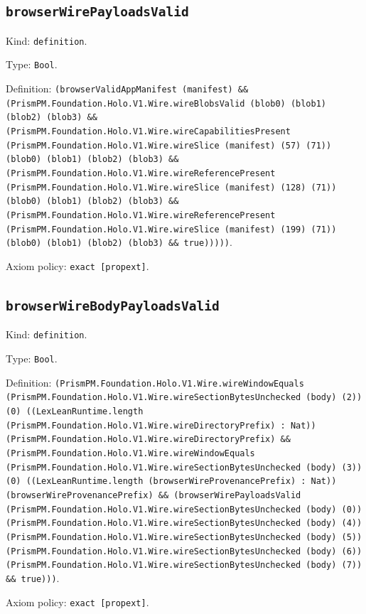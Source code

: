 \documentclass[11pt]{article}
\begin{document}
\subsection*{\texttt{browserWirePayloadsValid}}
\noindent Kind: \texttt{definition}.\par
\noindent Type: \texttt{Bool}.\par
\noindent Definition: \texttt{(browserValidAppManifest (manifest) \&\& (PrismPM.Foundation.Holo.V1.Wire.wireBlobsValid (blob0) (blob1) (blob2) (blob3) \&\& (PrismPM.Foundation.Holo.V1.Wire.wireCapabilitiesPresent (PrismPM.Foundation.Holo.V1.Wire.wireSlice (manifest) (57) (71)) (blob0) (blob1) (blob2) (blob3) \&\& (PrismPM.Foundation.Holo.V1.Wire.wireReferencePresent (PrismPM.Foundation.Holo.V1.Wire.wireSlice (manifest) (128) (71)) (blob0) (blob1) (blob2) (blob3) \&\& (PrismPM.Foundation.Holo.V1.Wire.wireReferencePresent (PrismPM.Foundation.Holo.V1.Wire.wireSlice (manifest) (199) (71)) (blob0) (blob1) (blob2) (blob3) \&\& true)))))}.\par
\noindent Axiom policy: \texttt{exact [propext]}.\par
\subsection*{\texttt{browserWireBodyPayloadsValid}}
\noindent Kind: \texttt{definition}.\par
\noindent Type: \texttt{Bool}.\par
\noindent Definition: \texttt{(PrismPM.Foundation.Holo.V1.Wire.wireWindowEquals (PrismPM.Foundation.Holo.V1.Wire.wireSectionBytesUnchecked (body) (2)) (0) ((LexLeanRuntime.length (PrismPM.Foundation.Holo.V1.Wire.wireDirectoryPrefix) : Nat)) (PrismPM.Foundation.Holo.V1.Wire.wireDirectoryPrefix) \&\& (PrismPM.Foundation.Holo.V1.Wire.wireWindowEquals (PrismPM.Foundation.Holo.V1.Wire.wireSectionBytesUnchecked (body) (3)) (0) ((LexLeanRuntime.length (browserWireProvenancePrefix) : Nat)) (browserWireProvenancePrefix) \&\& (browserWirePayloadsValid (PrismPM.Foundation.Holo.V1.Wire.wireSectionBytesUnchecked (body) (0)) (PrismPM.Foundation.Holo.V1.Wire.wireSectionBytesUnchecked (body) (4)) (PrismPM.Foundation.Holo.V1.Wire.wireSectionBytesUnchecked (body) (5)) (PrismPM.Foundation.Holo.V1.Wire.wireSectionBytesUnchecked (body) (6)) (PrismPM.Foundation.Holo.V1.Wire.wireSectionBytesUnchecked (body) (7)) \&\& true)))}.\par
\noindent Axiom policy: \texttt{exact [propext]}.\par
\end{document}
